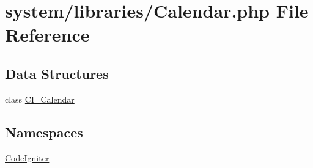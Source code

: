 \hypertarget{_calendar_8php}{\section{system/libraries/\-Calendar.php File Reference}
\label{_calendar_8php}
}
\subsection*{Data Structures}
\begin{DoxyCompactItemize}
\item 
class \hyperlink{class_c_i___calendar}{C\-I\-\_\-\-Calendar}
\end{DoxyCompactItemize}
\subsection*{Namespaces}
\begin{DoxyCompactItemize}
\item 
\hyperlink{namespace_code_igniter}{Code\-Igniter}
\end{DoxyCompactItemize}
